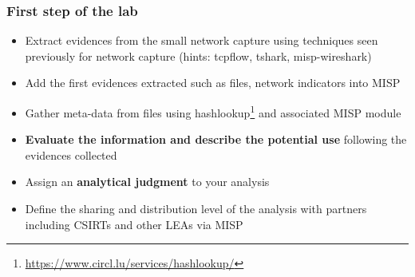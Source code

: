 \begin{frame}
    \frametitle{First step of the lab}
    \begin{itemize}
        \item Extract evidences from the small network capture using techniques seen previously for network capture (hints: tcpflow, tshark, misp-wireshark)
        \item Add the first evidences extracted such as files, network indicators into MISP
    \end{itemize}
\end{frame}

\begin{frame}
    \begin{itemize}
        \item Gather meta-data from files using hashlookup\footnote{\url{https://www.circl.lu/services/hashlookup/}} and associated MISP module
        \item {\bf Evaluate the information and describe the potential use} following the evidences collected
        \item Assign an {\bf analytical judgment} to your analysis
        \item Define the sharing and distribution level of the analysis with partners including CSIRTs and other LEAs via MISP
    \end{itemize}
\end{frame}

